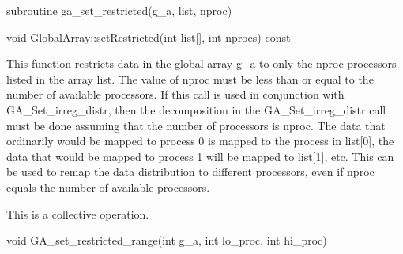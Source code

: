 \documentclass[12pt]{article}
\begin{document}
\begin{fapi}
\begin{fcode}
subroutine ga_set_restricted(g_a, list, nproc)
\end{fcode}
\begin{funcargs}
\end{funcargs}
\end{fapi}

\begin{cxxapi}
\begin{cxxcode}
void GlobalArray::setRestricted(int list[], int nprocs) const
\end{cxxcode}
\begin{funcargs}
\end{funcargs}
\end{cxxapi}
\gcoll

\begin{desc}

  This function restricts data in the global array g_a to only the
  nproc processors listed in the array list. The value of nproc must be
  less than or equal to the number of available processors. If this
  call is used in conjunction with GA_Set_irreg_distr, then the
  decomposition in the GA_Set_irreg_distr call must be done assuming
  that the number of processors is nproc. The data that ordinarily
  would be mapped to process 0 is mapped to the process in list[0],
  the data that would be mapped to process 1 will be mapped to
  list[1], etc. This can be used to remap the data distribution to
  different processors, even if nproc equals the number of available
  processors.

This is a collective operation.

\end{desc}


\begin{capi}
\begin{ccode}
void GA_set_restricted_range(int g_a, int lo_proc, int hi_proc)
\end{ccode}
\begin{funcargs}
\end{funcargs}
\end{capi}
\end{document}
